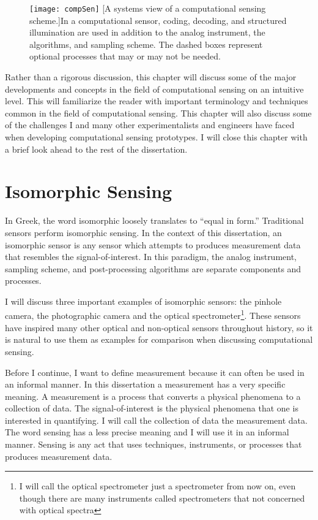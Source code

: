\begin{figure}
	\texttt{[image: compSen]}
	[A systems view of a computational sensing scheme.]{In a computational sensor, coding, decoding, and structured illumination are used in addition to the analog instrument, the algorithms, and sampling scheme. The dashed boxes represent optional processes that may or may not be needed. }
	\label{fig:compSen}
\end{figure}

Rather than a rigorous discussion, this chapter will discuss some of the major developments and concepts in the field of computational sensing on an intuitive level. This will familiarize the reader with important terminology and techniques common in the field of computational sensing. This chapter will also discuss some of the challenges I and many other experimentalists and engineers have faced when developing computational sensing prototypes. I will close this chapter with a brief look ahead to the rest of the dissertation. 


\section{Isomorphic Sensing}\label{sec:Isomorphic Sensing}

In Greek, the word isomorphic loosely translates to ``equal in form.'' Traditional sensors perform isomorphic sensing. In the context of this dissertation, an isomorphic sensor is any sensor which attempts to produces measurement data that resembles the signal-of-interest. In this paradigm, the analog instrument, sampling scheme, and post-processing algorithms are separate components and processes.

I will discuss three important examples of isomorphic sensors: the pinhole camera, the photographic camera and the optical spectrometer\footnote{I will call the optical spectrometer just a spectrometer from now on, even though there are many instruments called spectrometers that not concerned with optical spectra}. These sensors have inspired many other optical and non-optical sensors throughout history, so it is natural to use them as examples for comparison when discussing computational sensing. 

Before I continue, I want to define \gls{measurement} because it can often be used in an informal manner. In this dissertation a \gls{measurement} has a very specific meaning. A \gls{measurement} is a process that converts a physical phenomena to a collection of data. The signal-of-interest is the physical phenomena that one is interested in quantifying. I will call the collection of data the measurement data.  The word sensing has a less precise meaning and I will use it in an informal manner. Sensing is any act that uses techniques, instruments, or processes that produces measurement data. 

